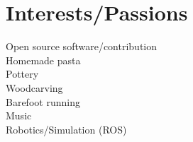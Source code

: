 \documentclass[letterpaper]{deedy-resume}
\begin{document}
\begin{minipage}[t]{0.25\textwidth}




\vspace{2em}
\section{Interests/Passions}
\vspace{1em}
\textbullet{} Open source software/contribution\\
\textbullet{} Homemade pasta\\
\textbullet{} Pottery\\
\textbullet{} Woodcarving\\
\textbullet{} Barefoot running\\
\textbullet{} Music\\
\textbullet{} Robotics/Simulation (ROS)\\

\end{minipage} %
\hfill
\vrule
\hspace{3ex}
%
%
\end{document}
